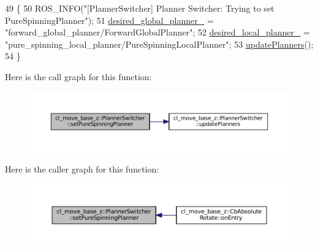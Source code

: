 \begin{DoxyCode}
49 \{
50   ROS\_INFO(\textcolor{stringliteral}{"[PlannerSwitcher] Planner Switcher: Trying to set PureSpinningPlanner"});
51   \hyperlink{classcl__move__base__z_1_1PlannerSwitcher_aef047d3778b2993c1df146bbad43e03d}{desired\_global\_planner\_} = \textcolor{stringliteral}{"forward\_global\_planner/ForwardGlobalPlanner"};
52   \hyperlink{classcl__move__base__z_1_1PlannerSwitcher_a6cbf65f11bb69125f913caaabdf7b4cf}{desired\_local\_planner\_} = \textcolor{stringliteral}{"pure\_spinning\_local\_planner/PureSpinningLocalPlanner"};
53   \hyperlink{classcl__move__base__z_1_1PlannerSwitcher_a146641f63aea3185daab4c5cbb789550}{updatePlanners}();
54 \}
\end{DoxyCode}
Here is the call graph for this function\+:
\nopagebreak
\begin{figure}[H]
\begin{center}
\leavevmode
\includegraphics[width=350pt]{classcl__move__base__z_1_1PlannerSwitcher_a0accdff89d7858658c1835f06b53786f_cgraph}
\end{center}
\end{figure}
Here is the caller graph for this function\+:
\nopagebreak
\begin{figure}[H]
\begin{center}
\leavevmode
\includegraphics[width=350pt]{classcl__move__base__z_1_1PlannerSwitcher_a0accdff89d7858658c1835f06b53786f_icgraph}
\end{center}
\end{figure}
\mbox{\label{classcl__move__base__z_1_1PlannerSwitcher_a22df6956c30a8e0ab4b942742cc8dafd}} 

